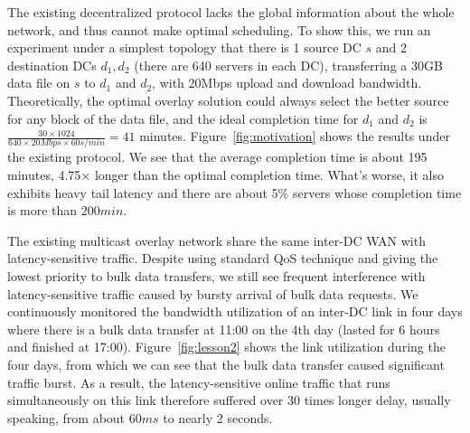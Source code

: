 %


The existing decentralized protocol lacks the global information
about the whole network, and thus cannot make optimal scheduling.
To show this, we run an experiment under a simplest topology that
there is 1 source DC $s$ and 2 destination DCs $d_1, d_2$
(there are 640 servers in each DC), transferring a 30GB data file
on $s$ to $d_1$ and $d_2$, with 20Mbps upload and download
bandwidth.
Theoretically, the optimal overlay solution could always select
the better source for any block of the data file, and the ideal
completion time for $d_1$ and $d_2$ is
$\frac{30\times 1024}{640\times 20Mbps \times 60s/min} = 41$
minutes.
Figure~\ref{fig:motivation} shows the results under the existing
protocol. We see that the average completion time is about
195 minutes, 4.75$\times$ longer than the optimal completion time.
What's worse, it also exhibits heavy tail latency and there are
about 5\% servers whose completion time is more than $200min$.


The existing multicast overlay network share the same inter-DC WAN
with latency-sensitive traffic.
Despite using standard QoS technique and giving the lowest priority to
bulk data transfers, we still see frequent interference with
latency-sensitive traffic caused by bursty arrival of bulk data
requests.
We continuously monitored the bandwidth utilization of an inter-DC
link in four days where there is a bulk data transfer at 11:00 on the
4th day (lasted for 6 hours and finished at 17:00).
Figure~\ref{fig:lesson2} shows the link utilization during the four
days, from which we can see that the bulk data transfer caused
significant traffic burst. As a result, the latency-sensitive online
traffic that runs simultaneously on this link therefore suffered over
30 times longer delay, usually speaking,
from about $60ms$ to nearly 2 seconds.



